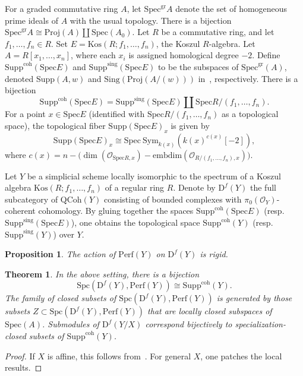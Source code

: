 \documentclass[11pt]{amsart}
\theoremstyle{definition}
\theoremstyle{plain}
\newtheorem{thm}[defn]{Theorem}
\newtheorem{prop}[defn]{Proposition}
\theoremstyle{remark}
\newcommand{\perf}{\mathrm{Perf}}
\newcommand{\qcoh}{\mathrm{QCoh}}
\newcommand{\Spec}{\mathrm{Spec}}
\newcommand{\mo}{\mathrm}
\newcommand{\Supp}{\mathrm{Supp}}
\newcommand{\sO}{\mathscr{O}}
\newcommand{\Sing}{\mathrm{Sing}}
\newcommand{\Spc}{\mathrm{Spc}}
\numberwithin{equation}{section}
\begin{document}
For a graded commutative ring \(A\), let \(\Spec^{\mo{gr}} A\) denote the set of homogeneous prime ideals of \(A\) with the usual topology.  
There is a bijection \(\Spec^{\mo{gr}} A \cong \mo{Proj}(A) \coprod \Spec(A_0)\).  
Let \(R\) be a commutative ring, and let \(f_1,\ldots,f_n \in R\).  
Set \(E = \mo{Kos}(R; f_1,\ldots,f_n)\), the Koszul \(R\)-algebra.  
Let \(A = R[x_1,\ldots,x_n]\), where each \(x_i\) is assigned homological degree \(-2\).
Define \(\Supp^{\mo{coh}}(\Spec E)\) and \(\Supp^{\mo{sing}}(\Spec E)\) to be the subspaces of \(\Spec^{\mo{gr}}(A)\), denoted \(\Supp(A,w)\) and \(\Sing(\mo{Proj}(A/(w)))\) in~\cite{liu2025classifying}, respectively.  
There is a bijection
\[
\Supp^{\mo{coh}}(\Spec E) = \Supp^{\mo{sing}}(\Spec E) \coprod \Spec R/(f_1,\ldots,f_n).
\]
For a point \(x\in \Spec E\) (identified with \(\Spec R/(f_1,\ldots,f_n)\) as a topological space), the topological fiber \(\Supp(\Spec E)_x\) is given by
\[
\Supp(\Spec E)_x \cong \Spec~ \mo{Sym}_{k(x)}(k(x)^{c(x)}[-2]),
\]
where \(c(x) = n - \bigl(\dim(\sO_{\Spec R,x}) - \mo{embdim}(\sO_{R/(f_1,\ldots,f_n),x})\bigr)\).

Let \(Y\) be a simplicial scheme locally isomorphic to the spectrum of a Koszul algebra \(\mo{Kos}(R;f_1,\ldots,f_n)\) of a regular ring \(R\).  
Denote by \(\mo{D}^f(Y)\) the full subcategory of \(\qcoh(Y)\) consisting of bounded complexes with \(\pi_0(\sO_Y)\)-coherent cohomology.  
By gluing together the spaces \(\Supp^{\mo{coh}}(\Spec E)\) (resp.~\(\Supp^{\mo{sing}}(\Spec E)\)), one obtains the topological space \(\Supp^{\mo{coh}}(Y)\) (resp.~\(\Supp^{\mo{sing}}(Y)\)) over \(Y\).

\begin{prop}
The action of \(\perf(Y)\) on \(\mo{D}^f(Y)\) is rigid.
\end{prop}

\begin{thm}
In the above setting, there is a bijection
\[
\Spc(\mo{D}^f(Y),\perf(Y)) \cong \Supp^{\mo{coh}}(Y).
\]
The family of closed subsets of \(\Spc(\mo{D}^f(Y),\perf(Y))\) is generated by those subsets \(Z \subset \Spc(\mo{D}^f(Y),\perf(Y))\) that are locally closed subspaces of \(\Spec(A)\).  
Submodules of \(\mo{D}^f(Y/X)\) correspond bijectively to specialization-closed subsets of \(\Supp^{\mo{coh}}(Y)\).
\end{thm}

\begin{proof}
If \(X\) is affine, this follows from~\cite{liu2025classifying}.  
For general \(X\), one patches the local results.
\end{proof}
\end{document}

